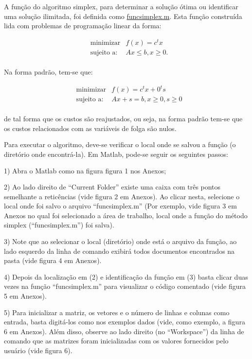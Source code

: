 \documentclass[10pt]{article}
\begin{document}
A função do algoritmo simplex, para determinar a solução ótima ou identificar uma solução ilimitada, foi definida como \underline{funcsimplex.m}. Esta função construída lida com problemas de programação linear da forma:

\begin{align*}
&\text{minimizar}& f(x) = c^{t}x\\  
&\text{sujeito a:}& Ax \le b, x \ge 0.\\
\end{align*}  

Na forma padrão, tem-se que:

\begin{align*}
&\text{minimizar}& f(x) = c^{t}x + 0^{t}s\\  
&\text{sujeito a:}& Ax + s = b, x \ge 0, s \ge 0\\
\end{align*}  

de tal forma que os custos são reajustados, ou seja, na forma padrão tem-se que os custos relacionados com as variáveis de folga são nulos.
\newline

Para executar o algoritmo, deve-se verificar o local onde se salvou a função (o diretório onde encontrá-la). Em Matlab, pode-se seguir os seguintes passos:
\newline

1) Abra o Matlab como na figura figura 1 nos Anexos;
\newline

2) Ao lado direito de ``Current Folder'' existe uma caixa com três pontos semelhante a reticências (vide figura 2 em Anexos). Ao clicar nesta, selecione o local onde foi salvo o arquivo ``funcsimplex.m'' (Por exemplo, vide figura 3 em Anexos no qual foi selecionado a área de trabalho, local onde a função do método simplex  (``funcsimplex.m'') foi salva).
\newline

3) Note que ao selecionar o local (diretório) onde está o arquivo da função, ao lado esquerdo da linha de comando exibirá todos documentos encontrados na pasta (vide figura 4 em Anexos).
\newline

4) Depois da localização em (2) e identificação da função em (3) basta clicar duas vezes na função ``funcsimplex.m'' para visualizar o código comentado (vide figura 5 em Anexos).
\newline

5) Para inicializar a matriz, os vetores e o número de linhas e colunas como entrada, basta digitá-los como nos exemplos dados (vide, como exemplo, a figura 6 em Anexos). Além disso, observe ao lado direito (no ``Workspace'') da linha de comando que as matrizes foram inicializadas com os valores fornecidos pelo usuário (vide figura 6).
\newline
\end{document}
